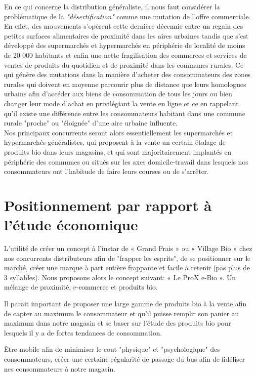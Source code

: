 \documentclass[12pt,a4paper]{report}
\begin{document}
		En ce qui concerne la distribution généraliste, il nous faut considérer la problématique de la \textit{"désertification"} comme une mutation de l’offre commerciale. En effet, des mouvements s'opèrent cette dernière décennie entre un regain des petites surfaces alimentaires de proximité dans les aires urbaines tandis que s'est développé des supermarchés et hypermarchés en périphérie de localité de moins de 20 000 habitants et enfin une nette fragilisation des commerces et services de ventes de produits du quotidien et de proximité dans les communes rurales.
		Ce qui génère des mutations dans la manière d'acheter des consommateurs des zones rurales qui doivent en moyenne parcourir plus de distance que leurs homologues urbains afin d'accéder aux biens de consommation de tous les jours ou bien changer leur mode d'achat en privilégiant la vente en ligne et ce en rappelant qu'il existe une différence entre les consommateurs habitant dans une commune rurale "proche" ou "éloignée" d'une aire urbaine influente.\\
		
		Nos principaux concurrents seront alors essentiellement les supermarchés et hypermarchés généralistes, qui proposent à la vente un certain étalage de produits bio dans leurs magasins, et qui sont majoritairement implantés en périphérie des communes ou situés sur les axes domicile-travail dans lesquels nos consommateurs ont l'habitude de faire leurs courses ou de s'arrêter. 
		
		
		
		
					\section{Positionnement par rapport à l'étude économique}	
		
		L'utilité de créer un concept à l’instar de « Grand Frais » ou « Village Bio » chez nos concurrents distributeurs afin de "frapper les esprits", de se positionner sur le marché, créer une marque à part entière frappante et facile à retenir (pas plus de 3 syllables). Nous proposons alors le concept suivant: « Le ProX e-Bio ». Un mélange de proximité, e-commerce et produits bio.
		
		
		Il parait important de proposer une large gamme de produits bio à la vente afin de capter au maximum le consommateur et qu'il puisse remplir son panier au maximum dans notre magasin et se baser sur l'étude des produits bio pour lesquels il y a de fortes tendances de consommation.  
		
		Être mobile afin de minimiser le cout "physique" et "psychologique" des consommateurs, créer une certaine régularité de passage du bus afin de fidéliser nes consommateurs à notre magasin.  
		
\end{document}
